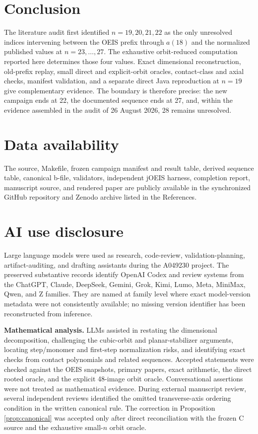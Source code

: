 \documentclass[11pt]{article}
\theoremstyle{definition}
\theoremstyle{remark}
\begin{document}
\section{Conclusion}

The literature audit first identified $n=19,20,21,22$ as the only unresolved
indices intervening between the OEIS prefix through $a(18)$ and the normalized
published values at $n=23,\ldots,27$.  The exhaustive orbit-reduced computation
reported here determines those four values.  Exact dimensional reconstruction,
old-prefix replay, small direct and explicit-orbit oracles, contact-class and
axial checks, manifest validation, and a separate direct Java reproduction at
$n=19$ give complementary evidence.  The boundary is
therefore precise: the new campaign ends at 22, the documented sequence ends
at 27, and, within the evidence assembled in the audit of 26 August 2026, 28
remains unresolved.

\section*{Data availability}

The source, Makefile, frozen campaign manifest and result table, derived
sequence table, canonical b-file, validators, independent jOEIS harness,
completion report, manuscript source, and rendered paper are publicly
available in the synchronized GitHub repository and Zenodo archive listed in
the References.

\section*{AI use disclosure}

Large language models were used as research, code-review,
validation-planning, artifact-auditing, and drafting assistants during the
A049230 project.  The preserved substantive records identify OpenAI Codex and
review systems from the ChatGPT, Claude, DeepSeek, Gemini, Grok, Kimi, Lumo,
Meta, MiniMax, Qwen, and Z families.  They are named at family level where
exact model-version metadata were not consistently available; no missing
version identifier has been reconstructed from inference.

\textbf{Mathematical analysis.}
LLMs assisted in restating the dimensional decomposition, challenging the
cubic-orbit and planar-stabilizer arguments, locating step/monomer and
first-step normalization risks, and identifying exact checks from contact
polynomials and related sequences.  Accepted statements were checked against
the OEIS snapshots, primary papers, exact arithmetic, the direct rooted oracle,
and the explicit 48-image orbit oracle.  Conversational assertions were not
treated as mathematical evidence.  During external manuscript review,
several independent reviews identified the omitted transverse-axis ordering
condition in the written canonical rule.  The correction in Proposition~
\ref{prop:canonical} was accepted only after direct reconciliation with the
frozen C source and the exhaustive small-$n$ orbit oracle.
\end{document}
